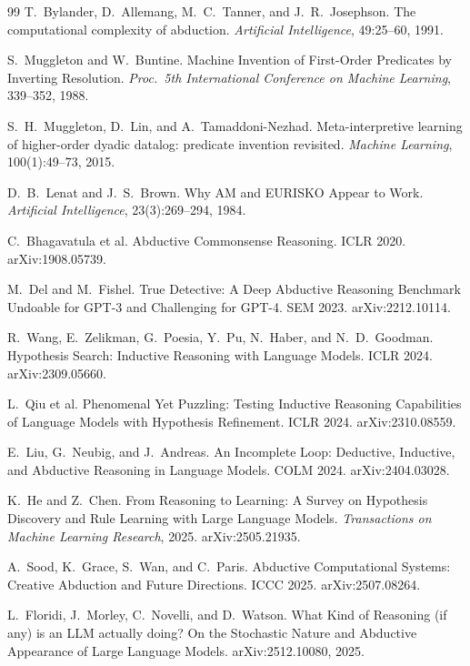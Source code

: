 \documentclass[11pt]{article}
\begin{document}
\begin{thebibliography}{99}
 T.~Bylander, D.~Allemang, M.~C.~Tanner, and J.~R.~Josephson.
\newblock The computational complexity of abduction.
\newblock \emph{Artificial Intelligence}, 49:25--60, 1991.

 S.~Muggleton and W.~Buntine.
\newblock Machine Invention of First-Order Predicates by Inverting Resolution.
\newblock \emph{Proc.\ 5th International Conference on Machine Learning}, 339--352, 1988.

 S.~H.~Muggleton, D.~Lin, and A.~Tamaddoni-Nezhad.
\newblock Meta-interpretive learning of higher-order dyadic datalog: predicate invention revisited.
\newblock \emph{Machine Learning}, 100(1):49--73, 2015.

 D.~B.~Lenat and J.~S.~Brown.
\newblock Why AM and EURISKO Appear to Work.
\newblock \emph{Artificial Intelligence}, 23(3):269--294, 1984.

 C.~Bhagavatula et al.
\newblock Abductive Commonsense Reasoning.
\newblock ICLR 2020. arXiv:1908.05739.

 M.~Del and M.~Fishel.
\newblock True Detective: A Deep Abductive Reasoning Benchmark Undoable for GPT-3 and Challenging for
GPT-4.
\newblock *SEM 2023. arXiv:2212.10114.

 R.~Wang, E.~Zelikman, G.~Poesia, Y.~Pu, N.~Haber, and N.~D.~Goodman.
\newblock Hypothesis Search: Inductive Reasoning with Language Models.
\newblock ICLR 2024. arXiv:2309.05660.

 L.~Qiu et al.
\newblock Phenomenal Yet Puzzling: Testing Inductive Reasoning Capabilities of Language Models with
Hypothesis Refinement.
\newblock ICLR 2024. arXiv:2310.08559.

 E.~Liu, G.~Neubig, and J.~Andreas.
\newblock An Incomplete Loop: Deductive, Inductive, and Abductive Reasoning in Language Models.
\newblock COLM 2024. arXiv:2404.03028.

 K.~He and Z.~Chen.
\newblock From Reasoning to Learning: A Survey on Hypothesis Discovery and Rule Learning with Large
Language Models.
\newblock \emph{Transactions on Machine Learning Research}, 2025. arXiv:2505.21935.

 A.~Sood, K.~Grace, S.~Wan, and C.~Paris.
\newblock Abductive Computational Systems: Creative Abduction and Future Directions.
\newblock ICCC 2025. arXiv:2507.08264.

 L.~Floridi, J.~Morley, C.~Novelli, and D.~Watson.
\newblock What Kind of Reasoning (if any) is an LLM actually doing? On the Stochastic Nature and
Abductive Appearance of Large Language Models.
\newblock arXiv:2512.10080, 2025.


\end{thebibliography}
\end{document}
